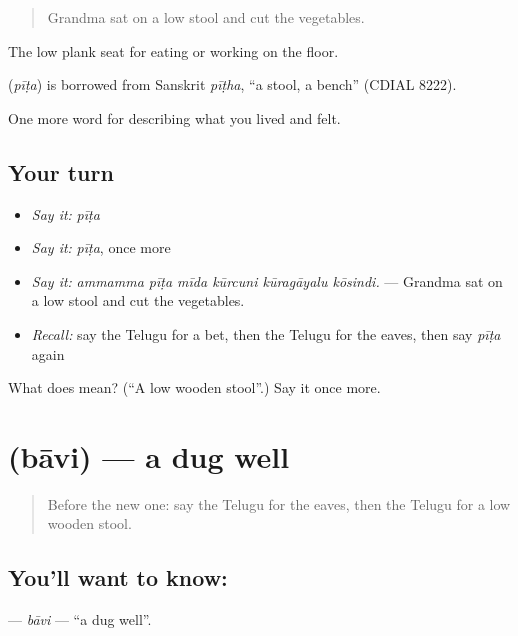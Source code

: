 \begin{quote}
Grandma sat on a low stool and cut the vegetables.
\end{quote}

The low plank seat for eating or working on the floor.

\begin{cousinweb}
\textbf{} (\emph{pīṭa}) is borrowed from Sanskrit \emph{pīṭha}, \textquotedblleft{}a stool, a bench\textquotedblright{} (CDIAL 8222).
\end{cousinweb}

\begin{grammarlens}[title={What you've built}]
One more word for describing what you lived and felt.
\end{grammarlens}

\subsection*{Your turn}
\begin{itemize}
\raggedright
  \item \emph{Say it:} \emph{pīṭa}
  \item \emph{Say it:} \emph{pīṭa}, once more
  \item \emph{Say it:} \emph{ammamma pīṭa mīda kūrcuni kūragāyalu kōsindi.} — Grandma sat on a low stool and cut the vegetables.
  \item \emph{Recall:} say the Telugu for a bet, then the Telugu for the eaves, then say \emph{pīṭa} again
\end{itemize}

\begin{tcolorbox}[breakable,colback=teal!4,colframe=teal!35!black,title={Before you move on}]
What does  mean? (\textquotedblleft{}A low wooden stool\textquotedblright{}.) Say it once more.
\end{tcolorbox}
\section[\texorpdfstring{\te{బావి} (bāvi)}{బావి (bāvi)}]{ (bāvi) — a dug well}

\label{lesson:TE-C546-bavi}



\begin{quote}
Before the new one: say the Telugu for the eaves, then the Telugu for a low wooden stool.
\end{quote}

\subsection*{You'll want to know: }
\textbf{} — \emph{bāvi} — \textquotedblleft{}a dug well\textquotedblright{}.

